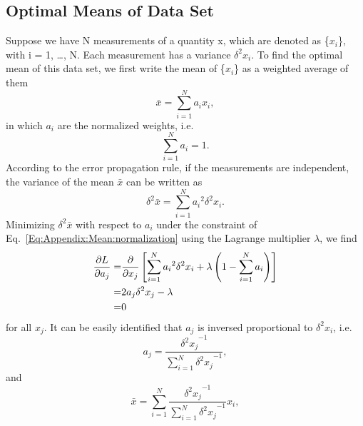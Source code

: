 \begin{appendices}
\chapter{Optimal Means of Data Set\label{chapter:Appendix:Mean}}
Suppose we have N measurements of a quantity x, which are denoted as \{$x_i$\}, with i = 1, \dots, N. Each measurement has a variance $\delta^2 x_i$. To find the optimal mean of this data set, we first write the mean of \{$x_i$\} as a weighted average of them
\begin{equation}
\bar{x}=\sum\limits_{i=1}^N a_i x_i,
\label{Eq:Appendix:Mean:mean}
\end{equation}
in which $a_i$ are the normalized weights, i.e.
\begin{equation}
\sum\limits_{i=1}^Na_i=1.
\label{Eq:Appendix:Mean:normalization}
\end{equation} 
According to the error propagation rule, if the measurements are independent, the variance of the mean $\bar{x}$ can be written as
\begin{equation}
\delta^2\bar{x}=\sum\limits_{i=1}^N{a_i}^2\delta^2x_i.
\label{Eq:Appendix:Mean:variaceofmean}
\end{equation}
Minimizing $\delta^2\bar{x}$ with respect to $a_i$ under the constraint of Eq.~\ref{Eq:Appendix:Mean:normalization} using the Lagrange multiplier $\lambda$, we find
\begin{align}
\frac{\partial L}{\partial a_j}=&\frac{\partial}{\partial x_j}\left[\sum\limits_{i=1}^{N}{a_i}^2\delta^2x_i+\lambda\left(1-\sum\limits_{i=1}^Na_i\right)\right]\notag\\
=&2a_j\delta^2x_j-\lambda\notag\\
=&0
\end{align}
for all {$x_j$}. It can be easily identified that $a_j$ is inversed proportional to $\delta^2x_i$, i.e.
\begin{equation}
a_j=\frac{{\delta^2x_j}^{-1}}{\sum\limits_{i=1}^N {\delta^2x_j}^{-1}},
\label{Eq:Appendix:Mean:aj}
\end{equation}
and
\begin{equation}
\bar{x}=\sum\limits_{i=1}^N \frac{{\delta^2x_j}^{-1}}{\sum\limits_{i=1}^N {\delta^2x_j}^{-1}} x_i,
\label{Eq:Appendix:Mean:meanexpanded}
\end{equation}


\end{appendices}
